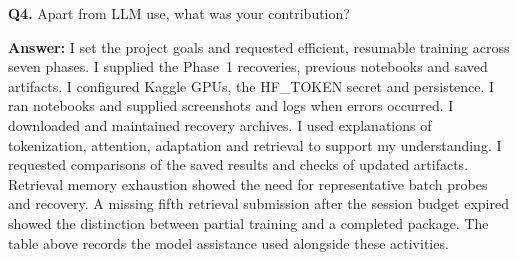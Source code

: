 \clearpage
\noindent\textbf{Q4.} Apart from LLM use, what was your contribution?

\noindent\textbf{Answer:} I set the project goals and requested efficient, resumable training across seven phases. I supplied the Phase~1 recoveries, previous notebooks and saved artifacts. I configured Kaggle GPUs, the HF\_TOKEN secret and persistence. I ran notebooks and supplied screenshots and logs when errors occurred. I downloaded and maintained recovery archives. I used explanations of tokenization, attention, adaptation and retrieval to support my understanding. I requested comparisons of the saved results and checks of updated artifacts. Retrieval memory exhaustion showed the need for representative batch probes and recovery. A missing fifth retrieval submission after the session budget expired showed the distinction between partial training and a completed package. The table above records the model assistance used alongside these activities.
